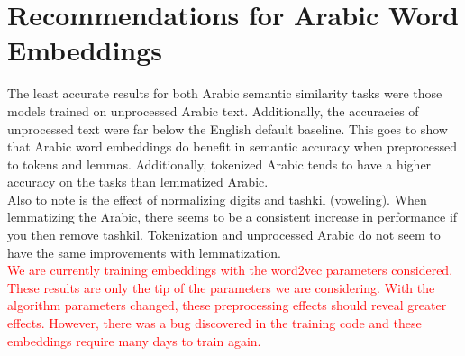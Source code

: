 \section{Recommendations for Arabic Word Embeddings}
\label{section:recommendations}

The least accurate results for both Arabic semantic similarity tasks were those models trained on unprocessed Arabic text. Additionally, the accuracies of unprocessed text were far below the English default baseline. This goes to show that Arabic word embeddings do benefit in semantic accuracy when preprocessed to tokens and lemmas. Additionally, tokenized Arabic tends to have a higher accuracy on the tasks than lemmatized Arabic.
\\
Also to note is the effect of normalizing digits and tashkil (voweling). When lemmatizing the Arabic, there seems to be a consistent increase in performance if you then remove tashkil. Tokenization and unprocessed Arabic do not seem to have the same improvements with lemmatization.
\\
\textcolor{red}{We are currently training embeddings with the word2vec parameters considered. These results are only the tip of the parameters we are considering. With the algorithm parameters changed, these preprocessing effects should reveal greater effects. However, there was a bug discovered in the training code and these embeddings require many days to train again.}

